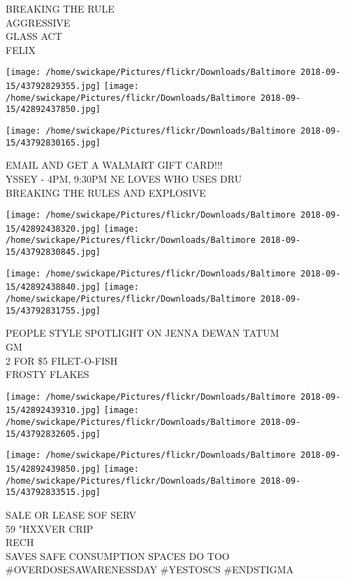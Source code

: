 \documentclass[10pt,letterpaper]{article}
\begin{document}
BREAKING THE RULE\\
AGGRESSIVE\\
GLASS ACT\\
FELIX\\
\pagebreak

\texttt{[image: /home/swickape/Pictures/flickr/Downloads/Baltimore 2018-09-15/43792829355.jpg]}
\texttt{[image: /home/swickape/Pictures/flickr/Downloads/Baltimore 2018-09-15/42892437850.jpg]}

\vspace{0.25in}
\texttt{[image: /home/swickape/Pictures/flickr/Downloads/Baltimore 2018-09-15/43792830165.jpg]}

EMAIL AND GET A WALMART GIFT CARD!!!\\
YSSEY {-} 4PM, 9:30PM NE LOVES WHO USES DRU\\
BREAKING THE RULES AND EXPLOSIVE\\
\pagebreak

\texttt{[image: /home/swickape/Pictures/flickr/Downloads/Baltimore 2018-09-15/42892438320.jpg]}
\texttt{[image: /home/swickape/Pictures/flickr/Downloads/Baltimore 2018-09-15/43792830845.jpg]}

\texttt{[image: /home/swickape/Pictures/flickr/Downloads/Baltimore 2018-09-15/42892438840.jpg]}
\texttt{[image: /home/swickape/Pictures/flickr/Downloads/Baltimore 2018-09-15/43792831755.jpg]}

PEOPLE STYLE SPOTLIGHT ON JENNA DEWAN TATUM\\
GM\\
2 FOR \$5 FILET{-}O{-}FISH\\
FROSTY FLAKES\\
\pagebreak

\texttt{[image: /home/swickape/Pictures/flickr/Downloads/Baltimore 2018-09-15/42892439310.jpg]}
\texttt{[image: /home/swickape/Pictures/flickr/Downloads/Baltimore 2018-09-15/43792832605.jpg]}

\texttt{[image: /home/swickape/Pictures/flickr/Downloads/Baltimore 2018-09-15/42892439850.jpg]}
\texttt{[image: /home/swickape/Pictures/flickr/Downloads/Baltimore 2018-09-15/43792833515.jpg]}

SALE OR LEASE SOF SERV\\
59 "HXXVER CRIP\\
RECH\\
SAVES SAFE CONSUMPTION SPACES DO TOO \#OVERDOSESAWARENESSDAY \#YESTOSCS \#ENDSTIGMA\\
\pagebreak
\end{document}
